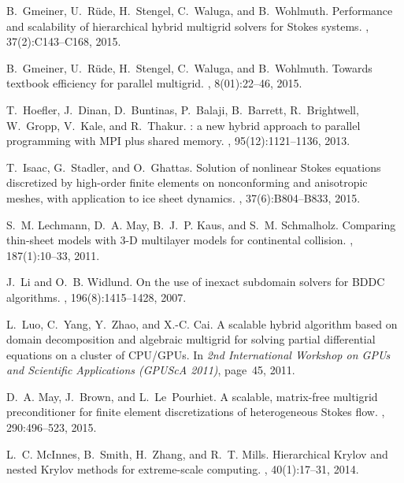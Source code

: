 \documentclass[]{siamart0216}
\begin{document}
\begin{thebibliography}{10}
B.~Gmeiner, U.~R{\"u}de, H.~Stengel, C.~Waluga, and B.~Wohlmuth.
\newblock Performance and scalability of hierarchical hybrid multigrid solvers
  for {S}tokes systems.
, 37(2):C143--C168, 2015.

B.~Gmeiner, U.~R{\"u}de, H.~Stengel, C.~Waluga, and B.~Wohlmuth.
\newblock Towards textbook efficiency for parallel multigrid.
,
  8(01):22--46, 2015.

T.~Hoefler, J.~Dinan, D.~Buntinas, P.~Balaji, B.~Barrett, R.~Brightwell,
  W.~Gropp, V.~Kale, and R.~Thakur.
: a new hybrid approach to parallel programming with {MPI}
  plus shared memory.
, 95(12):1121--1136, 2013.

T.~Isaac, G.~Stadler, and O.~Ghattas.
\newblock Solution of nonlinear {S}tokes equations discretized by high-order
  finite elements on nonconforming and anisotropic meshes, with application to
  ice sheet dynamics.
, 37(6):B804--B833, 2015.

S.~M. Lechmann, D.~A. May, B.~J.~P. Kaus, and S.~M. Schmalholz.
\newblock Comparing thin-sheet models with {3-D} multilayer models for
  continental collision.
, 187(1):10--33, 2011.

J.~Li and O.~B. Widlund.
\newblock On the use of inexact subdomain solvers for {BDDC} algorithms.
,
  196(8):1415--1428, 2007.

L.~Luo, C.~Yang, Y.~Zhao, and X.-C. Cai.
\newblock A scalable hybrid algorithm based on domain decomposition and
  algebraic multigrid for solving partial differential equations on a cluster
  of {CPU/GPU}s.
\newblock In {\em 2nd International Workshop on GPUs and Scientific
  Applications (GPUScA 2011)}, page~45, 2011.

D.~A. May, J.~Brown, and L.~Le~Pourhiet.
\newblock A scalable, matrix-free multigrid preconditioner for finite element
  discretizations of heterogeneous {S}tokes flow.
,
  290:496--523, 2015.

L.~C. McInnes, B.~Smith, H.~Zhang, and R.~T. Mills.
\newblock Hierarchical {K}rylov and nested {K}rylov methods for extreme-scale
  computing.
, 40(1):17--31, 2014.


\end{thebibliography}
\end{document}

